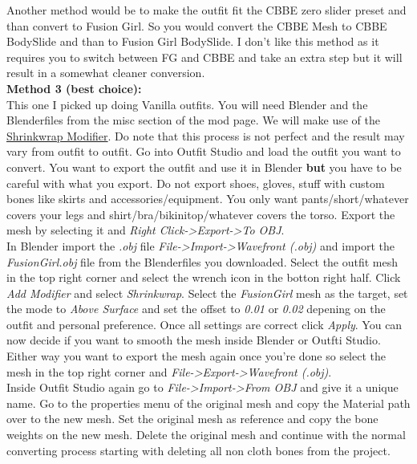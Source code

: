 Another method would be to make the outfit fit the CBBE zero slider preset and than convert to Fusion Girl. So you would convert the 
CBBE Mesh to CBBE BodySlide and than to Fusion Girl BodySlide. I don't like this method as it requires you to switch between FG and CBBE 
and take an extra step but it will result in a somewhat cleaner conversion.\\
\textbf{Method 3 (best choice):}\\
This one I picked up doing Vanilla outfits. You will need Blender and the Blenderfiles from the misc section of the mod page. We will make use of the 
\href{https://docs.blender.org/manual/en/latest/modeling/modifiers/deform/shrinkwrap.html}{Shrinkwrap Modifier}. Do note that this 
process is not perfect and the result may vary from outfit to outfit. Go into Outfit Studio and load the outfit you want to convert.
You want to export the outfit and use it in Blender \textbf{but} you have to be careful with what you export. Do not export shoes, gloves, 
stuff with custom bones like skirts and accessories/equipment. You only want pants/short/whatever covers your legs and shirt/bra/bikinitop/whatever covers the torso.
Export the mesh by selecting it and \textit{Right Click->Export->To OBJ}.\\
In Blender import the \textit{.obj} file \textit{File->Import->Wavefront (.obj)} and import the \textit{FusionGirl.obj} file from 
the Blenderfiles you downloaded. Select the outfit mesh in the top right corner and select the wrench icon in the botton right half.
Click \textit{Add Modifier} and select \textit{Shrinkwrap}. Select the \textit{FusionGirl} mesh as the target, set the mode to \textit{Above Surface} 
and set the offset to \textit{0.01} or \textit{0.02} depening on the outfit and personal preference. Once all settings are correct click \textit{Apply}.
You can now decide if you want to smooth the mesh inside Blender or Outfti Studio. Either way you want to export the mesh again once you're done 
so select the mesh in the top right corner and \textit{File->Export->Wavefront (.obj)}.\\
Inside Outfit Studio again go to \textit{File->Import->From OBJ} and give it a unique name. Go to the properties menu of the original mesh 
and copy the Material path over to the new mesh. Set the original mesh as reference and copy the bone weights on the new mesh. Delete the 
original mesh and continue with the normal converting process starting with deleting all non cloth bones from the project.